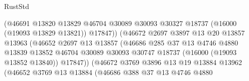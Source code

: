 \begin{lexlean}{RustStd}
\begin{coremodule}
                                        (@46691
                                          @13820
                                          @13829
                                          @46704
                                          @30089
                                          @30093
                                          @30327
                                          @18737
                                          (@16000 (@19093 @13829 @13821))
                                          @17847))
                                      (@46672
                                        @2697
                                        @3897
                                        @13
                                        @20
                                        @13857
                                        @13963
                                        (@46652
                                          @2697
                                          @13
                                          @13857
                                          (@46686
                                            @285
                                            @37
                                            @13
                                            @4746
                                            @4880
                                            @13839
                                            @13852
                                            @46704
                                            @30089
                                            @30093
                                            @30747
                                            @18737
                                            (@16000 (@19093 @13852 @13840))
                                            @17847))
                                        (@46672
                                          @3769
                                          @3896
                                          @13
                                          @19
                                          @13884
                                          @13962
                                          (@46652
                                            @3769
                                            @13
                                            @13884
                                            (@46686
                                              @388
                                              @37
                                              @13
                                              @4746
                                              @4880

\end{coremodule}
\end{lexlean}
